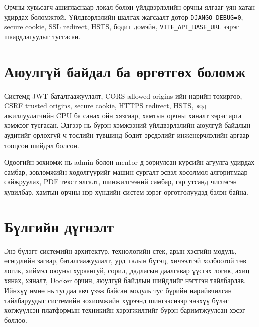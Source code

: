 Орчны хувьсагч ашигласнаар локал болон үйлдвэрлэлийн орчны ялгааг уян хатан удирдах боломжтой. Үйлдвэрлэлийн шалгах жагсаалт дотор \texttt{DJANGO\_DEBUG=0}, secure cookie, SSL redirect, HSTS, бодит домэйн, \texttt{VITE\_API\_BASE\_URL} зэрэг шаардлагуудыг тусгасан.

\section{Аюулгүй байдал ба өргөтгөх боломж}
Системд JWT баталгаажуулалт, CORS allowed origins-ийн нарийн тохиргоо, CSRF trusted origins, secure cookie, HTTPS redirect, HSTS, код ажиллуулагчийн CPU ба санах ойн хязгаар, хамтын орчны хяналт зэрэг арга хэмжээг тусгасан. Эдгээр нь бүрэн хэмжээний үйлдвэрлэлийн аюулгүй байдлын аудитийг орлохгүй ч төслийн түвшинд бодит эрсдэлийг инженерчлэлийн аргаар тооцсон шийдэл болсон.

Одоогийн зохиомж нь admin болон mentor-д зориулсан курсийн агуулга удирдах самбар, зөвлөмжийн хөдөлгүүрийг машин сургалт эсвэл хосолмол алгоритмаар сайжруулах, PDF текст ялгалт, шинжилгээний самбар, гар утсанд чиглэсэн хувилбар, хамтын орчны нэр хүндийн систем зэрэг өргөтгөлүүдэд бэлэн байна.

\section{Бүлгийн дүгнэлт}
Энэ бүлэгт системийн архитектур, технологийн стек, арын хэсгийн модуль, өгөгдлийн загвар, баталгаажуулалт, урд талын бүтэц, хичээлтэй холбоотой төв логик, хиймэл оюуны хураангуй, сорил, дадлагын даалгавар үүсгэх логик, ахиц хянах, хяналт, Docker орчин, аюулгүй байдлын шийдлийг нэгтгэн тайлбарлав. Ийнхүү өмнө нь тусдаа авч үзэж байсан модуль тус бүрийн нарийвчилсан тайлбаруудыг системийн зохиомжийн хүрээнд шингээснээр энэхүү бүлэг хөгжүүлсэн платформын техникийн хэрэгжилтийг бүрэн баримтжуулсан хэсэг боллоо.
